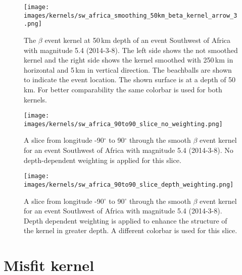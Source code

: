 \begin{figure}[h]
\begin{center}
\texttt{[image: images/kernels/sw\_africa\_smoothing\_50km\_beta\_kernel\_arrow\_3.png]}
\caption[Effects of smoothing on an event kernel]
{The $\beta$ event kernel at 50$\,$km depth of an event 
Southwest of Africa with magnitude 5.4 (2014-3-8).
The left side shows the not smoothed kernel and the
right side shows the kernel smoothed with 250$\,$km in 
horizontal and 5$\,$km in vertical direction.
The beachballs are shown to indicate the event location.
The shown surface is at a depth of 50$\,$km.
For better comparability the same colorbar is used for both kernels.}  
\label{smoothing}
\end{center}
\end{figure}



\begin{figure}[h]
\begin{center}
\texttt{[image: images/kernels/sw\_africa\_90to90\_slice\_no\_weighting.png]}
\caption[Non weighted slice from longitude -90$^\circ$ to 90$^\circ$ through a smooth $\beta$ event kernel]
{A slice from longitude -90$^\circ$ to 90$^\circ$ through the smooth $\beta$ event kernel for an event Southwest of Africa with 
magnitude 5.4 (2014-3-8). 
No depth-dependent weighting is applied for this slice.}  
\label{sw_africa_no_weight}
\texttt{[image: images/kernels/sw\_africa\_90to90\_slice\_depth\_weighting.png]}
\caption[Depth-dependent weighted slice from longitude -90$^\circ$ to 90$^\circ$ through a smooth $\beta$ event kernel]
{A slice from longitude -90$^\circ$ to 90$^\circ$ through the smooth $\beta$ event kernel for an event Southwest of Africa with 
magnitude 5.4 (2014-3-8). 
Depth dependent weighting is applied to enhance the structure of the kernel in greater depth.
A different colorbar is used for this slice.}  
\label{sw_africa_depth_weight}
\end{center}
\end{figure}

\newpage


\section{Misfit kernel}

